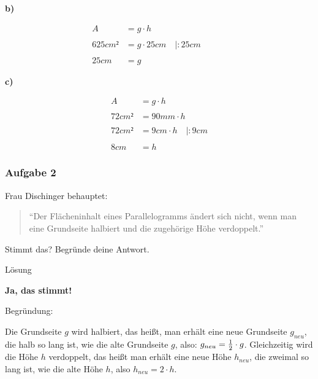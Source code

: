 \documentclass[
  ngerman,
]{book}
\begin{document}
\textbf{b)}

\[\begin{align} A \quad &= g \cdot h \\
{}\\
625 cm² &= g \cdot 25cm  \quad | : 25 cm\quad\quad\quad\\
{}\\
25 cm &= g \end{align}\]

\textbf{c)}

\[ \begin{align} A\quad &=  g \cdot h \\
{}\\
72 cm² &= 90mm \cdot h\\
{}\\
72 cm² &= 9cm \cdot h \quad |:9cm\\
{}\\
8cm &= h \end{align}\]

\hypertarget{section-7}{%
\subsubsection*{}\label{section-7}}

\hypertarget{aufgabe-2-2}{%
\subsubsection*{Aufgabe 2}\label{aufgabe-2-2}}

Frau Dischinger behauptet:

\begin{quote}
``Der Flächeninhalt eines Parallelogramms ändert sich nicht, wenn man eine Grundseite halbiert und die zugehörige Höhe verdoppelt.''
\end{quote}

Stimmt das?
Begründe deine Antwort.

Lösung

\textbf{Ja, das stimmt!}

Begründung:

Die Grundseite \(g\) wird halbiert, das heißt, man erhält eine neue Grundseite \(g_{neu}\), die halb so lang ist, wie die alte Grundseite \(g\), also: \(g_{neu}={1 \over 2} \cdot g\).
Gleichzeitig wird die Höhe \(h\) verdoppelt, das heißt man erhält eine neue Höhe \(h_{neu}\), die zweimal so lang ist, wie die alte Höhe \(h\), also \(h_{neu}= 2 \cdot h\).
\end{document}

